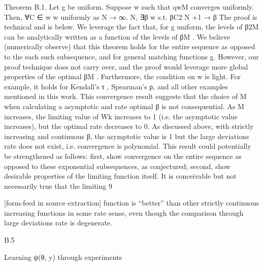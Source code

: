 \documentclass[10pt]{article}
\begin{document}
\begin{ReviewVerbatim}
Theorem B.1. Let g be uniform. Suppose w such that qwM converges uniformly. Then, ∀C ∈
w
w uniformly as N → ∞.
N, ∃β w s.t. βC2
N +1 → β
The proof is technical and is below. We leverage the fact that, for g uniform, the levels of β2M
can be analytically written as a function of the levels of βM . We believe (numerically observe)
that this theorem holds for the entire sequence as opposed to the each such subsequence, and for
general matching functions g. However, our proof technique does not carry over, and the proof
would leverage more global properties of the optimal βM .
Furthermore, the condition on w is light. For example, it holds for Kendall’s τ , Spearman’s ρ,
and all other examples mentioned in this work.
This convergence result suggests that the choice of M when calculating a asymptotic and rate
optimal β is not consequential. As M increases, the limiting value of Wk increases to 1 (i.e. the
asymptotic value increases), but the optimal rate decreases to 0. As discussed above, with strictly
increasing and continuous β, the asymptotic value is 1 but the large deviations rate does not exist,
i.e. convergence is polynomial.
This result could potentially be strengthened as follows: first, show convergence on the entire
sequence as opposed to these exponential subsequences, as conjectured; second, show desirable
properties of the limiting function itself. It is conceivable but not necessarily true that the limiting
9


[form-feed in source extraction]
function is “better” than other strictly continuous increasing functions in some rate sense, even
though the comparison through large deviations rate is degenerate.

B.5

Learning ψ(θ, y) through experiments


\end{ReviewVerbatim}
\end{document}
